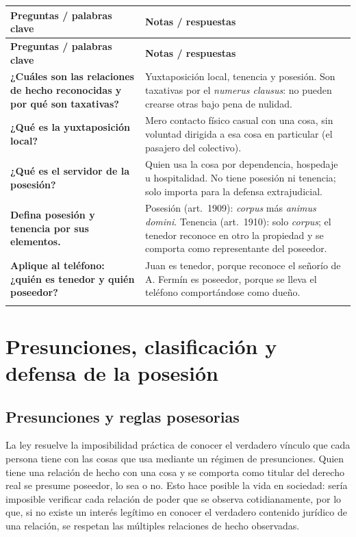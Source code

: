 \documentclass[12pt,oneside]{book}
\makeatletter
\renewcommand{\arraystretch}{1.25}
\newcommand{\cq}[2]{\textbf{#1} & #2 \\[0.45em]}
\newcommand{\cornell}[3]{%
\par\bigskip\noindent{\large\bfseries Cuadro Cornell: #1}\par\nopagebreak\smallskip
\begingroup
\small
\renewcommand{\arraystretch}{1.15}
\begin{longtable}{@{}>{\raggedright\arraybackslash}p{0.26\textwidth}>{\raggedright\arraybackslash}p{0.66\textwidth}@{}}
\toprule
\textbf{Preguntas / palabras clave} & \textbf{Notas / respuestas} \\
\midrule
\endfirsthead
\toprule
\textbf{Preguntas / palabras clave} & \textbf{Notas / respuestas} \\
\midrule
\endhead
#2
\midrule
\multicolumn{2}{@{}p{\dimexpr0.92\textwidth+2\tabcolsep\relax}@{}}{\vspace{0.2em}\textbf{Resumen.} #3\vspace{0.2em}} \\
\bottomrule
\end{longtable}
\endgroup
}
\makeatother
\begin{document}
\cornell{relaciones de poder}{
\cq{¿Cuáles son las relaciones de hecho reconocidas y por qué son taxativas?}{Yuxtaposición local, tenencia y posesión. Son taxativas por el \textit{numerus clausus}: no pueden crearse otras bajo pena de nulidad.}
\cq{¿Qué es la yuxtaposición local?}{Mero contacto físico casual con una cosa, sin voluntad dirigida a esa cosa en particular (el pasajero del colectivo).}
\cq{¿Qué es el servidor de la posesión?}{Quien usa la cosa por dependencia, hospedaje u hospitalidad. No tiene posesión ni tenencia; solo importa para la defensa extrajudicial.}
\cq{Defina posesión y tenencia por sus elementos.}{Posesión (art.~1909): \textit{corpus} más \textit{animus domini}. Tenencia (art.~1910): solo \textit{corpus}; el tenedor reconoce en otro la propiedad y se comporta como representante del poseedor.}
\cq{Aplique al teléfono: ¿quién es tenedor y quién poseedor?}{Juan es tenedor, porque reconoce el señorío de A. Fermín es poseedor, porque se lleva el teléfono comportándose como dueño.}
}{Las relaciones de poder reconocidas son taxativas. La posesión exige \textit{corpus} y \textit{animus domini}; la tenencia, solo \textit{corpus}, reconociendo en otro la propiedad; el servidor de la posesión usa la cosa por dependencia, hospedaje u hospitalidad y solo interesa para la defensa extrajudicial.}

\chapter[Presunciones, clasificación y defensa de la posesión]{Presunciones, clasificación y defensa de la posesión}\label{cap:clasificacion}

\section{Presunciones y reglas posesorias}

La ley resuelve la imposibilidad práctica de conocer el verdadero vínculo que cada persona tiene con las cosas que usa mediante un régimen de presunciones. Quien tiene una relación de hecho con una cosa y se comporta como titular del derecho real se presume poseedor, lo sea o no. Esto hace posible la vida en sociedad: sería imposible verificar cada relación de poder que se observa cotidianamente, por lo que, si no existe un interés legítimo en conocer el verdadero contenido jurídico de una relación, se respetan las múltiples relaciones de hecho observadas.
\end{document}

